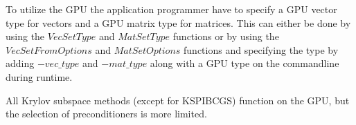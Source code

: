 To utilize the GPU the application programmer have to specify a GPU vector type 
for vectors and a GPU matrix type for matrices. This can either be done by using 
the $VecSetType$ and $MatSetType$ functions or by using the $VecSetFromOptions$ 
and $MatSetOptions$ functions and specifying the type by adding $-vec\_type$ and 
$-mat\_type$ along with a GPU type on the commandline during runtime. 

All Krylov subspace methods (except for KSPIBCGS) function on the GPU, but the 
selection of preconditioners is more limited. 
